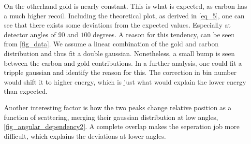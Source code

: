 On the otherhand gold is nearly constant. This is what is expected, as carbon has a much higher recoil. Including the theoretical plot, as derived in \cref{eq_5}, one can see that there exists some deviations from the expected values. Especially at detector angles of $90$ and $100$ degrees.
A reason for this tendency, can be seen from \cref{fig_data}. We assume a linear combination of the gold and carbon distribution and thus fit a double gaussian. Nonetheless, a small bump is seen between the carbon and gold contributions. In a further analysis, one could fit a tripple gaussian and identify the reason for this. The correction in bin number would shift it to higher energy, which is just what would explain the lower energy than expected.

Another interesting factor is how the two peaks change relative position as a
function of scattering, merging their gaussian distribution at low angles, \cref{fig_angular_dependency2}. A complete overlap makes the seperation job more difficult, which explains the deviations at lower angles.


